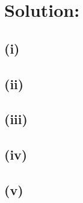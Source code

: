 \documentclass[a4paper,12pt]{article}
\begin{document}
\section*{Solution:}
\subsection*{(i)} 
\subsection*{(ii)} 
\subsection*{(iii)} 
\subsection*{(iv)} 
\subsection*{(v)} 
\end{document}
